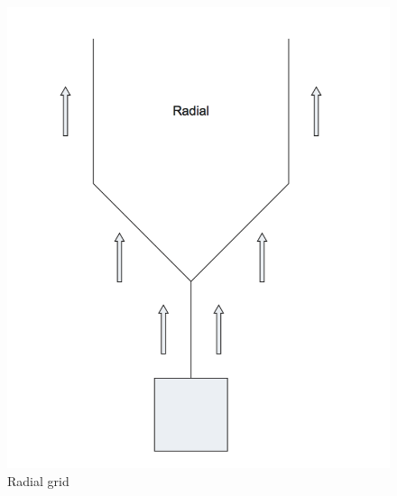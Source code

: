 \begin{figure}[!tbp]
  \centering
  \begin{minipage}[b]{0.4\textwidth}
    \includegraphics[scale=0.15, natwidth=754,natheight=909]{imgs/radialgrid.png}
    \caption{Radial grid}\label{fig:2}
  \end{minipage}
  \hfill
  \begin{minipage}[b]{0.4\textwidth}

\end{minipage}
\end{figure}
